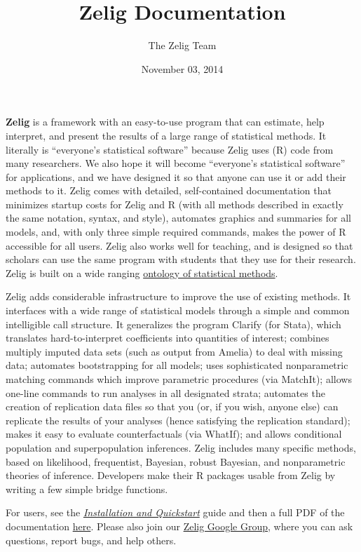\documentclass[letterpaper,10pt,english]{sphinxmanual}
\title{Zelig Documentation}
\date{November 03, 2014}
\author{The Zelig Team}
\begin{document}
\maketitle
\tableofcontents
{}\label{index::doc}


\textbf{Zelig} is a framework with an easy-to-use program that can estimate, help interpret, and present the results of a large range of statistical methods. It literally is ``everyone's statistical software'' because Zelig uses (R) code from many researchers. We also hope it will become ``everyone's statistical software'' for applications, and we have designed it so that anyone can use it or add their methods to it. Zelig comes with detailed, self-contained documentation that minimizes startup costs for Zelig and R (with all methods described in exactly the same notation, syntax, and style), automates graphics and summaries for all models, and, with only three simple required commands, makes the power of R accessible for all users. Zelig also works well for teaching, and is designed so that scholars can use the same program with students that they use for their research. Zelig is built on a wide ranging \href{http://gking.harvard.edu/files/abs/z-abs.shtml}{ontology of statistical methods}.

Zelig adds considerable infrastructure to improve the use of existing methods. It interfaces with a wide range of statistical models through a simple and common intelligible call structure. It generalizes the program Clarify (for Stata), which translates hard-to-interpret coefficients into quantities of interest; combines multiply imputed data sets (such as output from Amelia) to deal with missing data; automates bootstrapping for all models; uses sophisticated nonparametric matching commands which improve parametric procedures (via MatchIt); allows one-line commands to run analyses in all designated strata; automates the creation of replication data files so that you (or, if you wish, anyone else) can replicate the results of your analyses (hence satisfying the replication standard); makes it easy to evaluate counterfactuals (via WhatIf); and allows conditional population and superpopulation inferences. Zelig includes many specific methods, based on likelihood, frequentist, Bayesian, robust Bayesian, and nonparametric theories of inference.  Developers make their R packages usable from Zelig by writing a few simple bridge functions.

For users, see the {\hyperref[installation_quickstart:installation-quickstart]{\emph{Installation and Quickstart}}} guide and then a full PDF of the documentation \href{http://zeligproject.org/build/latex/Zelig.pdf}{here}. Please also join our \href{https://groups.google.com/forum/\#!forum/zelig-statistical-software}{Zelig Google Group}, where you can ask questions, report bugs, and help others.
\end{document}
